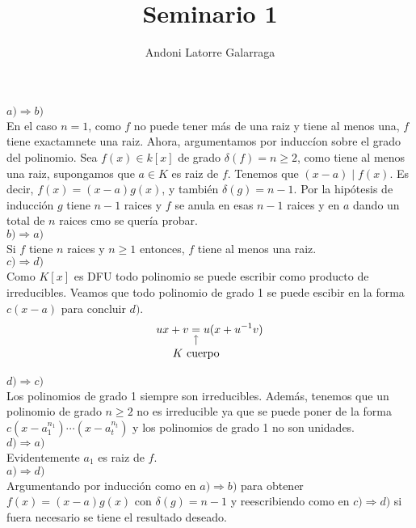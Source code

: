 \documentclass{article}
\title{Seminario 1}
\author{Andoni Latorre Galarraga}
\date{}
\newcommand{\nota}[3][2ex]{
    \underset{\mathclap{
        \begin{tikzpicture}
          \draw[->] (0, 0) to ++(0,#1);
          \node[below] at (0,0) {#3};
        \end{tikzpicture}}}{#2}
}
\begin{document}
\maketitle

$\boxed{a)\Rightarrow b)}$\\
En el caso $n=1$, como $f$ no puede tener más de una raiz y tiene al menos una, $f$ tiene exactamnete una raiz. Ahora, argumentamos por induccíon sobre el grado del polinomio. Sea $f(x)\in k[x]$ de grado $\delta(f)=n\ge 2$, como tiene al menos una raiz, supongamos que $a\in K$ es raiz de $f$. Tenemos que $(x-a)\mid f(x)$. Es decir, $f(x)=(x-a)g(x)$, y también $\delta(g)=n-1$. Por la hipótesis de inducción $g$ tiene $n-1$ raices y $f$ se anula en esas $n-1$ raices y en $a$ dando un total de $n$ raices cmo se quería probar.\\

$\boxed{b)\Rightarrow a)}$\\
Si $f$ tiene $n$ raices y $n\ge 1$ entonces, $f$ tiene al menos una raiz.\\

$\boxed{c)\Rightarrow d)}$\\
Como $K[x]$ es DFU todo polinomio se puede escribir como producto de irreducibles. Veamos que todo polinomio de grado 1 se puede escibir en la forma $c(x-a)$ para concluir $d)$.\\
$$
ux+v \nota{=}{$K$ cuerpo} u(x+u^{-1}v)
$$

$\boxed{d)\Rightarrow c)}$\\
Los polinomios de grado 1 siempre son irreducibles. Además, tenemos que un polinomio de grado $n\ge 2$ no es irreducible ya que se puede poner de la forma $c(x-a_1^{n_1})\cdots (x-a_t^{n_t})$ y los polinomios de grado 1 no son unidades.\\

$\boxed{d)\Rightarrow a)}$\\
Evidentemente $a_1$ es raiz de $f$.\\

$\boxed{a)\Rightarrow d)}$\\
Argumentando por inducción como en $\boxed{a)\Rightarrow b)}$ para obtener $f(x)=(x-a)g(x)$ con $\delta(g)=n-1$ y reescribiendo como en $\boxed{c)\Rightarrow d)}$ si fuera necesario se tiene el resultado deseado.
\end{document}
